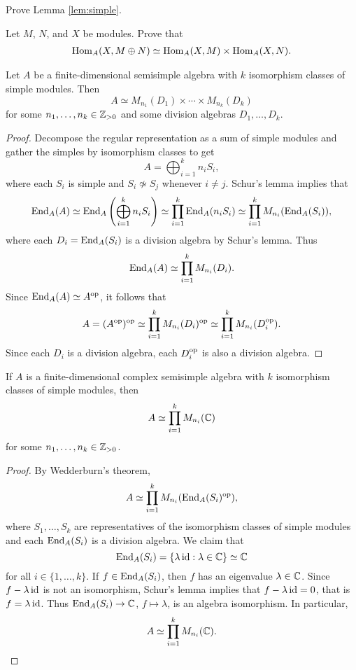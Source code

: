 \begin{exercise}
    Prove Lemma \ref{lem:simple}.
\end{exercise}

\begin{exercise}
    Let $M$, $N$, and $X$ be modules. Prove that 
    \begin{align}
        \operatorname{Hom}_A(X,M\oplus N)\simeq\operatorname{Hom}_A(X,M)\times\operatorname{Hom}_A(X,N).
    \end{align}
\end{exercise}

\begin{theorem}
Let $A$ be a finite-dimensional semisimple algebra with  
$k$ isomorphism classes of simple modules. Then 
\[
A\simeq M_{n_1}(D_1)\times\cdots\times M_{n_k}(D_k)
\]
for some $n_1,\dots,n_k\in\mathbb{Z}_{>0}$ and some division algebras $D_1,\dots,D_k$.
\end{theorem}

\begin{proof}
    Decompose the regular representation as a sum of simple modules and
    gather the simples by isomorphism classes to get 	
    \[
	A=\bigoplus_{i=1}^k n_iS_i,
	\]
	where each $S_i$ is simple and $S_i\not\simeq S_j$ whenever 
	$i\ne j$. Schur's lemma implies that  
	\begin{align*}
		\operatorname{End}_A(A)\simeq\operatorname{End}_A\left(\bigoplus_{i=1}^kn_iS_i\right)
		\simeq \prod_{i=1}^k\operatorname{End}_A(n_iS_i)
		\simeq\prod_{i=1}^kM_{n_i}(\operatorname{End}_A(S_i)), 
	\end{align*}
	where each $D_i=\operatorname{End}_A(S_i)$ is a division algebra by Schur's lemma. 
    Thus
    \[
		\operatorname{End}_A(A)\simeq\prod_{i=1}^kM_{n_i}(D_i).
	\]
	Since $\operatorname{End}_A(A)\simeq
	A^{\operatorname{op}}$, it follows that  
	\begin{align*}
		A=(A^{\operatorname{op}})^{\operatorname{op}}\simeq \prod_{i=1}^kM_{n_i}(D_i)^{\operatorname{op}}\simeq \prod_{i=1}^kM_{n_i}(D_i^{\operatorname{op}}).
	\end{align*}
	Since each $D_i$ is a division algebra, each $D_i^{\operatorname{op}}$ is also a division algebra.
\end{proof}

\begin{corollary}[Mollien]
	If $A$ is a finite-dimensional complex semisimple algebra
	with $k$ isomorphism classes of simple modules, 
	then 
	\[
	A\simeq\prod_{i=1}^k M_{n_i}(\mathbb{C})
	\]  
	for some $n_1,\dots,n_k\in\mathbb{Z}_{>0}$. 
\end{corollary}

\begin{proof}
	By Wedderburn's theorem,  
	\[
	A\simeq \prod_{i=1}^k M_{n_i}(\operatorname{End}_A(S_i)^{\operatorname{op}}),
	\]
	where $S_1,\dots,S_k$ are representatives of the isomorphism classes of simple modules
	and each $\operatorname{End}_A(S_i)$ is a division algebra. We claim that 
	\[
	\operatorname{End}_A(S_i)=\{\lambda\operatorname{id}:\lambda\in\mathbb{C}\}\simeq\mathbb{C}
	\]
	for all $i\in\{1,\dots,k\}$. If  
	$f\in\operatorname{End}_A(S_i)$, then $f$ has an eigenvalue $\lambda\in\mathbb{C}$. Since  
	$f-\lambda\operatorname{id}$ is not an isomorphism, Schur's lemma implies that $f-\lambda\operatorname{id}=0$, 
	that is $f=\lambda\operatorname{id}$. Thus $\operatorname{End}_A(S_i)\to\mathbb{C}$, $f\mapsto\lambda$, 
	is an algebra isomorphism. In particular,  
	\[
	A\simeq \prod_{i=1}^k M_{n_i}(\mathbb{C}).\qedhere
	\]
\end{proof}

